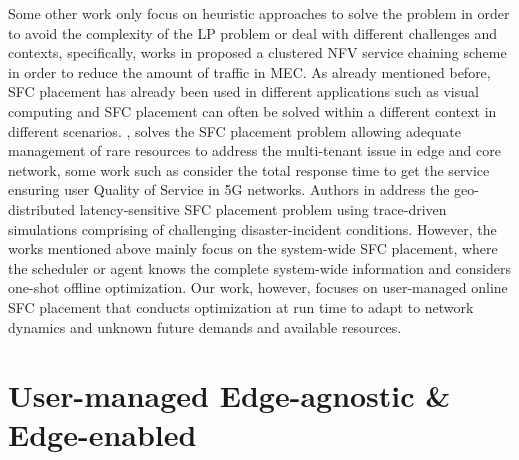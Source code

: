 Some other work\cite{clusteredSFCplacement,ProbabilisticQoSEdge} only focus on heuristic approaches to solve the problem in order to avoid the complexity of the LP problem or deal with different challenges and contexts, specifically, works in \cite{clusteredSFCplacement} proposed a clustered NFV service chaining scheme in order to reduce the amount of traffic in MEC. As already mentioned before, SFC placement has already been used in different applications such as visual computing\cite{sfcgeo} and SFC placement can often be solved within a different context in different scenarios. \eg, \cite{VNFmonoedgecore} solves the SFC placement problem allowing adequate management of rare resources to address the multi-tenant issue in edge and core network, some work such as \cite{VNF5G} consider the total response time to get the service ensuring user Quality of Service in 5G networks. Authors in \cite{sfcgeo} address the geo-distributed latency-sensitive SFC placement problem using trace-driven simulations comprising of challenging disaster-incident conditions. 
However, the works mentioned above mainly focus on the system-wide SFC placement, where the scheduler or agent knows the complete system-wide information and considers one-shot offline optimization. Our work, however, focuses on user-managed online SFC placement that conducts optimization at run time to adapt to network dynamics and unknown future demands and available resources.

\section{User-managed Edge-agnostic \& Edge-enabled}

